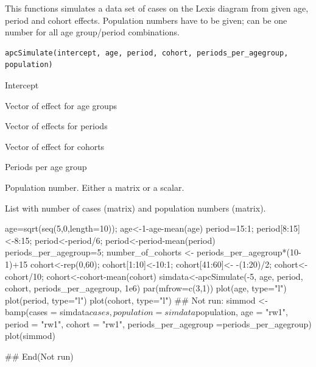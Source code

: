 \documentclass[a4paper]{book}
\begin{document}
%
\begin{Description}
This functions simulates a data set of cases on the Lexis diagram from given age, period and cohort effects. Population numbers have to be given; can be one number for all age group/period combinations.
\end{Description}
%
\begin{Usage}
\begin{verbatim}
apcSimulate(intercept, age, period, cohort, periods_per_agegroup, population)
\end{verbatim}
\end{Usage}
%
\begin{Arguments}
\begin{ldescription}
\item[\code{intercept}] Intercept

\item[\code{age}] Vector of effect for age groups

\item[\code{period}] Vector of effects for periods

\item[\code{cohort}] Vector of effect for cohorts

\item[\code{periods\_per\_agegroup}] Periods per age group

\item[\code{population}] Population number. Either a matrix or a scalar.
\end{ldescription}
\end{Arguments}
%
\begin{Value}
List with number of cases (matrix) and population numbers (matrix).
\end{Value}
%
\begin{SeeAlso}
\end{SeeAlso}
%
\begin{Examples}
\begin{ExampleCode}
age=sqrt(seq(5,0,length=10)); age<-1-age-mean(age)
period=15:1; period[8:15]<-8:15; period<-period/6; period<-period-mean(period)
periods_per_agegroup=5; number_of_cohorts <- periods_per_agegroup*(10-1)+15
cohort<-rep(0,60); cohort[1:10]<-10:1; cohort[41:60]<- -(1:20)/2; cohort<-cohort/10;
cohort<-cohort-mean(cohort)
simdata<-apcSimulate(-5, age, period, cohort, periods_per_agegroup, 1e6)
par(mfrow=c(3,1))
plot(age, type="l")
plot(period, type="l")
plot(cohort, type="l")
## Not run: 
simmod <- bamp(cases = simdata$cases, population = simdata$population, age = "rw1", 
period = "rw1", cohort = "rw1", periods_per_agegroup =periods_per_agegroup)
plot(simmod)

## End(Not run)
\end{ExampleCode}
\end{Examples}
\end{document}
